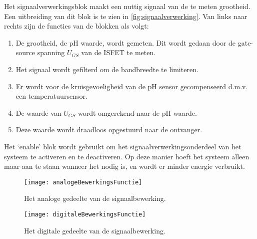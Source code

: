 
Het signaalverwerkingsblok maakt een nuttig signaal van de te meten grootheid. Een uitbreiding van dit blok is te zien in \cref{fig:signaalverwerking}.
Van links naar rechts zijn de functies van de blokken als volgt:
\begin{enumerate}
    \item De grootheid, de pH waarde, wordt gemeten. Dit wordt gedaan door de gate-source spanning $U_{GS}$ van de ISFET te meten.
    \item Het signaal wordt gefilterd om de bandbreedte te limiteren.
    \item Er wordt voor de kruisgevoeligheid van de pH sensor gecompenseerd d.m.v. een temperatuursensor.
    \item De waarde van $U_{GS}$ wordt omgerekend naar de pH waarde.
    \item Deze waarde wordt draadloos opgestuurd naar de ontvanger.
\end{enumerate}
Het `enable' blok wordt gebruikt om het signaalverwerkingsonderdeel van het systeem te activeren en te deactiveren. Op deze manier hoeft het systeem alleen maar aan te staan wanneer het nodig is, en wordt er minder energie verbruikt.




\begin{figure}[ht]
    \centering
    \texttt{[image: analogeBewerkingsFunctie]}
    \caption{Het analoge gedeelte van de signaalbewerking.} 
    \label{fig:analogeBewerkingsFunctie}
\end{figure}


\begin{figure}[ht]
    \centering
    \texttt{[image: digitaleBewerkingsFunctie]}
    \caption{Het digitale gedeelte van de signaalbewerking.} 
    \label{fig:digitaleBewerkingsFunctie}
\end{figure}



